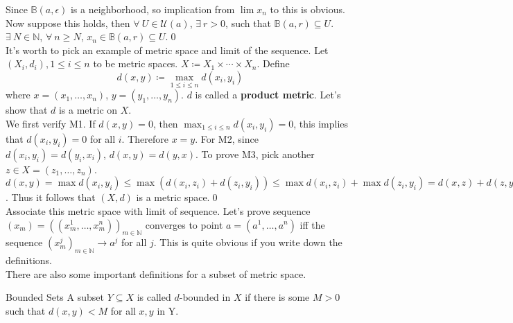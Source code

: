 \documentclass{article}
\begin{document}
Since $\mathbb{B}(a, \epsilon)$ is a neighborhood, so implication from $\lim x_n$ to this is obvious. Now suppose this holds, then $\forall\ U \in \mathcal{U}(a)$, $\exists\ r > 0$, such that $\mathbb{B}(a,r) \subseteq U$.
$\exists\ N \in \mathbb{N}$, $\forall\ n \geq N$, $x_n \in \mathbb{B}(a,r) \subseteq U$.\qed 
\\It's worth to pick an example of metric space and limit of the sequence. Let $(X_i, d_i), 1 \leq i \leq n$ to be metric spaces. $X \coloneq X_1 \times \cdots \times X_n$. Define 
$$
d(x, y)\coloneq \max_{1 \leq i \leq n}d(x_i, y_i)
$$
where $x = (x_1, \dots, x_n)$, $y = (y_1, \dots, y_n)$. $d$ is called a \textbf{product metric}. Let's show that $d$ is a metric on $X$.\\
We first verify M1. If $d(x,y) = 0$, then $\displaystyle{\max_{1 \leq i \leq n}}d(x_i, y_i) = 0$, this implies that $d(x_i,y_i) = 0$ for all $i$. Therefore $x = y$. For M2, since $d(x_i, y_i) = d(y_i, x_i)$, $d(x,y) = d(y,x)$.
To prove M3, pick another $z \in X = (z_1, \dots, z_n)$. $d(x, y) = \max d(x_i, y_i) \leq \max (d(x_i, z_i) + d(z_i, y_i)) \leq \max d(x_i, z_i) + \max d(z_i, y_i) = d(x,z) + d(z, y)$. Thus it follows that $(X, d)$ is a metric space.\qed\\
Associate this metric space with limit of sequence. Let's prove sequence $(x_m) = ((x_m ^ 1, \dots , x_m ^n))_{m \in \mathbb{N}}$ converges to point $a = (a^1, \dots ,a^n)$ iff the sequence $(x_m ^ j)_{m \in \mathbb{N}} \rightarrow a^j$ for all $j$.
This is quite obvious if you write down the definitions.\\
There are also some important definitions for a subset of metric space. 
\begin{defin}{Bounded Sets}
    A subset $Y \subseteq X$ is called $d$-bounded in $X$ if there is some $M >0$ such that $d(x,y) < M$ for all $x, y$ in Y.
\end{defin}
\end{document}
